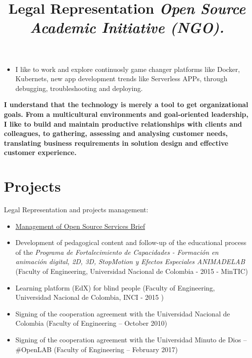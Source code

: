 \documentclass[overlapped,line,final]{res}
\begin{document}
\begin{resume}
\begin{itemize}
    \item I like to work and explore continuosly game changer platforms like Docker, Kubernets, new app development trends like Serverless APPs, through debugging, troubleshooting and deploying.
\end{itemize}
    
	\textbf {I understand that the technology is merely a tool to get organizational goals. From a multicultural environments and goal-oriented leadership, I like to build and maintain productive relationships with clients and colleagues, to gathering, assessing and analysing customer needs, translating business requirements in solution design and effective customer experience.}

\vspace{0.5cm}
\section{\sc Projects } %
\vspace{0.5cm}
\title{\bf Legal Representation
	\newline \em Open Source Academic Initiative (NGO).
}
\begin{position}
Legal Representation and projects management:

\begin{itemize}
\item \href{https://opensai.org/business}{Management of Open Source Services Brief}
\item Development of pedagogical content and follow-up of the educational process of the \textit{Programa de Fortalecimiento de Capacidades - Formación en animación digital, 2D, 3D, StopMotion y Efectos Especiales ANIMADELAB} (Faculty of Engineering, Universidad Nacional de Colombia - 2015 - MinTIC)
\item Learning platform (EdX) for blind people (Faculty of Engineering, Universidad Nacional de Colombia, INCI - 2015 )
\item Signing of the cooperation agreement with the Universidad Nacional de Colombia (Faculty of Engineering – October 2010)
\item Signing of the cooperation agreement with the Universidad Minuto de Dios – \#OpenLAB (Faculty of Engineering – February 2017)
\end{itemize}


\end{position}
\end{resume}
\end{document}
